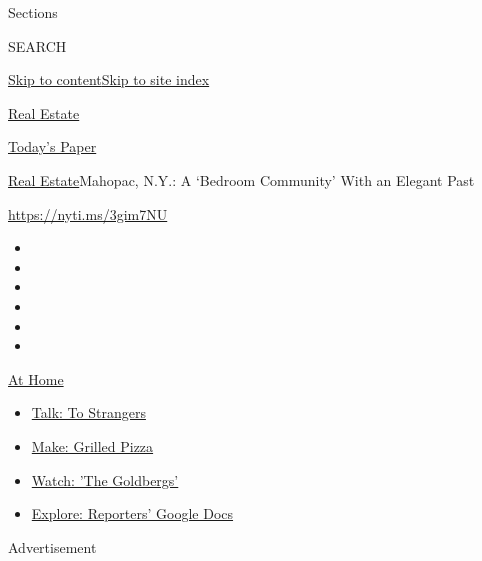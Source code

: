 Sections

SEARCH

\protect\hyperlink{site-content}{Skip to
content}\protect\hyperlink{site-index}{Skip to site index}

\href{https://www.nytimes.com/section/realestate}{Real Estate}

\href{https://myaccount.nytimes.com/auth/login?response_type=cookie\&client_id=vi}{}

\href{https://www.nytimes.com/section/todayspaper}{Today's Paper}

\href{/section/realestate}{Real Estate}\textbar{}Mahopac, N.Y.: A
`Bedroom Community' With an Elegant Past

\url{https://nyti.ms/3gim7NU}

\begin{itemize}
\item
\item
\item
\item
\item
\item
\end{itemize}

\href{https://www.nytimes.com/spotlight/at-home?action=click\&pgtype=Article\&state=default\&region=TOP_BANNER\&context=at_home_menu}{At
Home}

\begin{itemize}
\tightlist
\item
  \href{https://www.nytimes.com/2020/08/03/well/family/the-benefits-of-talking-to-strangers.html?action=click\&pgtype=Article\&state=default\&region=TOP_BANNER\&context=at_home_menu}{Talk:
  To Strangers}
\item
  \href{https://www.nytimes.com/2020/08/01/at-home/coronavirus-make-pizza-on-a-grill.html?action=click\&pgtype=Article\&state=default\&region=TOP_BANNER\&context=at_home_menu}{Make:
  Grilled Pizza}
\item
  \href{https://www.nytimes.com/2020/07/31/arts/television/goldbergs-abc-stream.html?action=click\&pgtype=Article\&state=default\&region=TOP_BANNER\&context=at_home_menu}{Watch:
  'The Goldbergs'}
\item
  \href{https://www.nytimes.com/interactive/2020/at-home/even-more-reporters-editors-diaries-lists-recommendations.html?action=click\&pgtype=Article\&state=default\&region=TOP_BANNER\&context=at_home_menu}{Explore:
  Reporters' Google Docs}
\end{itemize}

Advertisement

